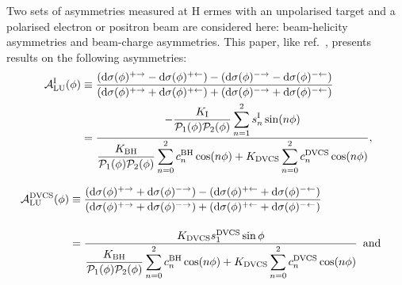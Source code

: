 Two sets of asymmetries measured at H{\sc
ermes} with an unpolarised target and a polarised electron or positron
beam are considered here:
beam-helicity asymmetries and beam-charge asymmetries. This paper, like ref.~\cite{Air09}, presents results on the following asymmetries:
\begin{align}
\hspace{0.5cm}\mathcal{A}^{\textrm{I}}_{\textrm{LU}}(\phi) &\equiv
\frac{(\textrm{d}\sigma(\phi)^{+\rightarrow} -
\textrm{d}\sigma(\phi)^{+\leftarrow}) -
(\textrm{d}\sigma(\phi)^{-\rightarrow}
- \textrm{d}\sigma(\phi)^{-\leftarrow})}{(\textrm{d}\sigma(\phi)^{+\rightarrow}
+
\textrm{d}\sigma(\phi)^{+\leftarrow}) +
(\textrm{d}\sigma(\phi)^{-\rightarrow}
+ \textrm{d}\sigma(\phi)^{-\leftarrow})}&  \nonumber \\
&=\dfrac{-\dfrac{K_{\textrm{I}}}{\mathcal{P}_{1}(\phi)\mathcal{P}_{2}(\phi)}
\displaystyle\sum_{n=1}^2
s_{n}^{\textrm{I}}\sin(n\phi)}{\dfrac{K_{\textrm{BH}}}{\mathcal{P}_{1}
(\phi)\mathcal{P}_{
2}(\phi)}
\displaystyle\sum_{n=0}^2
c_{n}^{\textrm{BH}}\cos(n\phi) + 
K_{\textrm{DVCS}}\displaystyle\sum_{n=0}^2 c_{n}^{\textrm{DVCS}}\cos(n\phi)},& 
\label{e:alui}
\end{align}

\begin{align}
\mathcal{A}^{\textrm{DVCS}}_{\textrm{LU}}(\phi) &\equiv
\frac{(\textrm{d}\sigma(\phi)^{+\rightarrow} +
\textrm{d}\sigma(\phi)^{-\rightarrow}) -
(\textrm{d}\sigma(\phi)^{+\leftarrow} + 
\textrm{d}\sigma(\phi)^{-\leftarrow})}
{(\textrm{d}\sigma(\phi)^{+\rightarrow} +
\textrm{d}\sigma(\phi)^{-\rightarrow}) +
(\textrm{d}\sigma(\phi)^{+\leftarrow}
+ \textrm{d}\sigma(\phi)^{-\leftarrow})}& \nonumber \\[0.4cm]
&=\dfrac{ K_{\textrm{DVCS}} s_{1}^{\textrm{DVCS}}\sin\phi}{\dfrac{K_{\textrm{BH}}}{\mathcal{P}_{1}
(\phi)\mathcal{P}_{2}(\phi)}
\displaystyle\sum_{n=0}^2
c_{n}^{\textrm{BH}}\cos(n\phi) + 
K_{\textrm{DVCS}}\displaystyle\sum_{n=0}^2
c_{n}^{\textrm{DVCS}}\cos(n\phi)} \textrm{\, and}&
\label{e:aludvcs}
\end{align}

